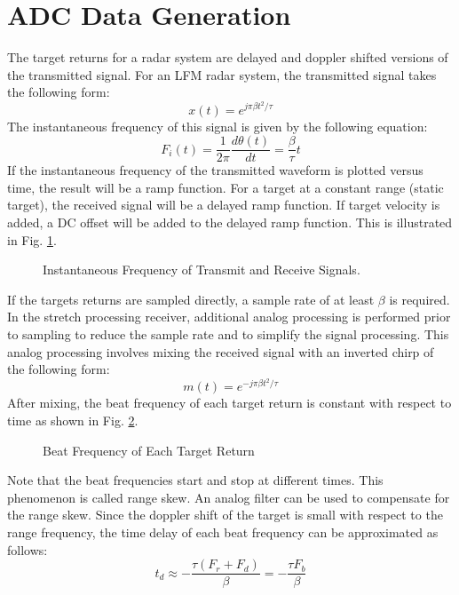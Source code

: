 \documentclass[conference]{IEEEtran}
\begin{document}
\section{ADC Data Generation}
The target returns for a radar system are delayed and doppler shifted versions of the transmitted signal. For an LFM radar system, the transmitted signal takes the following form:
\begin{equation}
x(t) = e^{j\pi\beta t^2/\tau}
\end{equation}
The instantaneous frequency of this signal is given by the following equation:
\begin{equation}
F_i(t) = \frac{1}{2\pi}\frac{d\theta(t)}{dt} = \frac{\beta}{\tau}t
\end{equation}
If the instantaneous frequency of the transmitted waveform is plotted versus time, the result will be a ramp function. For a target at a constant range (static target), the received signal will be a delayed ramp function. If target velocity is added, a DC offset will be added to the delayed ramp function. This is illustrated in Fig. \ref{inst_freq}.
\begin{figure}[H]
\centerline{}
\caption{Instantaneous Frequency of Transmit and Receive Signals.}
\label{inst_freq}
\end{figure}
If the targets returns are sampled directly, a sample rate of at least $\beta$ is required. In the stretch processing receiver, additional analog processing is performed prior to sampling to reduce the sample rate and to simplify the signal processing. This analog processing involves mixing the received signal with an inverted chirp of the following form:
\begin{equation}
m(t) = e^{-j\pi\beta t^2/\tau}
\end{equation}
After mixing, the beat frequency of each target return is constant with respect to time as shown in Fig. \ref{beat_freq_new}.
\begin{figure}[H]
\centerline{}
\caption{Beat Frequency of Each Target Return}
\label{beat_freq_new}
\end{figure}
Note that the beat frequencies start and stop at different times. This phenomenon is called range skew. An analog filter can be used to compensate for the range skew. Since the doppler shift of the target is small with respect to the range frequency, the time delay of each beat frequency can be approximated as follows:
\begin{equation}
t_d \approx -\frac{\tau(F_r+F_d)}{\beta} = -\frac{\tau F_b}{\beta}
\end{equation}
\end{document}
